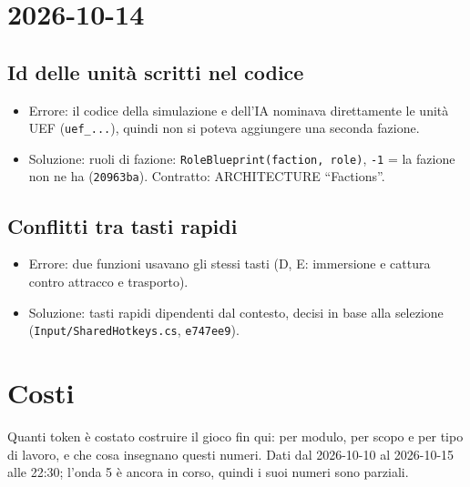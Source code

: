 \documentclass[11pt]{article}
\begin{document}
\section{2026-10-14}
\label{sec:orge613f85}

\subsection{Id delle unità scritti nel codice}
\label{sec:orgb11678c}
\begin{itemize}
\item Errore: il codice della simulazione e dell'IA nominava direttamente le unità UEF (\texttt{uef\_...}), quindi non si
poteva aggiungere una seconda fazione.
\item Soluzione: ruoli di fazione: \texttt{RoleBlueprint(faction, role)}, \texttt{-1} = la fazione non ne ha (\texttt{20963ba}).
Contratto: ARCHITECTURE ``Factions''.
\end{itemize}
\subsection{Conflitti tra tasti rapidi}
\label{sec:org22850f6}
\begin{itemize}
\item Errore: due funzioni usavano gli stessi tasti (D, E: immersione e cattura contro attracco e trasporto).
\item Soluzione: tasti rapidi dipendenti dal contesto, decisi in base alla selezione (\texttt{Input/SharedHotkeys.cs},
\texttt{e747ee9}).
\end{itemize}
\section{Costi}
\label{sec:org0c05727}

Quanti token è costato costruire il gioco fin qui: per modulo, per scopo e per tipo di lavoro, e che cosa insegnano
questi numeri. Dati dal 2026-10-10 al 2026-10-15 alle 22:30; l'onda 5 è ancora in corso, quindi i suoi numeri sono
parziali.
\end{document}
